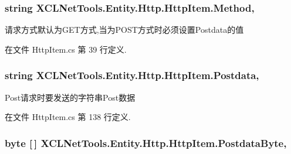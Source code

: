 \subsubsection[{\texorpdfstring{Method}{Method}}]{\setlength{\rightskip}{0pt plus 5cm}string X\+C\+L\+Net\+Tools.\+Entity.\+Http.\+Http\+Item.\+Method\hspace{0.3cm}{\ttfamily [get]}, {\ttfamily [set]}}\hypertarget{class_x_c_l_net_tools_1_1_entity_1_1_http_1_1_http_item_a4c675d85e9d3864e5c5ad04c4a4ae3cd}{}\label{class_x_c_l_net_tools_1_1_entity_1_1_http_1_1_http_item_a4c675d85e9d3864e5c5ad04c4a4ae3cd}


请求方式默认为\+G\+E\+T方式,当为\+P\+O\+S\+T方式时必须设置\+Postdata的值 



在文件 Http\+Item.\+cs 第 39 行定义.

\subsubsection[{\texorpdfstring{Postdata}{Postdata}}]{\setlength{\rightskip}{0pt plus 5cm}string X\+C\+L\+Net\+Tools.\+Entity.\+Http.\+Http\+Item.\+Postdata\hspace{0.3cm}{\ttfamily [get]}, {\ttfamily [set]}}\hypertarget{class_x_c_l_net_tools_1_1_entity_1_1_http_1_1_http_item_a9151cc1e4067ca0b035052ee0a8b3de9}{}\label{class_x_c_l_net_tools_1_1_entity_1_1_http_1_1_http_item_a9151cc1e4067ca0b035052ee0a8b3de9}


Post请求时要发送的字符串\+Post数据 



在文件 Http\+Item.\+cs 第 138 行定义.

\subsubsection[{\texorpdfstring{Postdata\+Byte}{PostdataByte}}]{\setlength{\rightskip}{0pt plus 5cm}byte \mbox{[}$\,$\mbox{]} X\+C\+L\+Net\+Tools.\+Entity.\+Http.\+Http\+Item.\+Postdata\+Byte\hspace{0.3cm}{\ttfamily [get]}, {\ttfamily [set]}}\hypertarget{class_x_c_l_net_tools_1_1_entity_1_1_http_1_1_http_item_a49b2ba8771878dab0de105397ebc69de}{}\label{class_x_c_l_net_tools_1_1_entity_1_1_http_1_1_http_item_a49b2ba8771878dab0de105397ebc69de}


